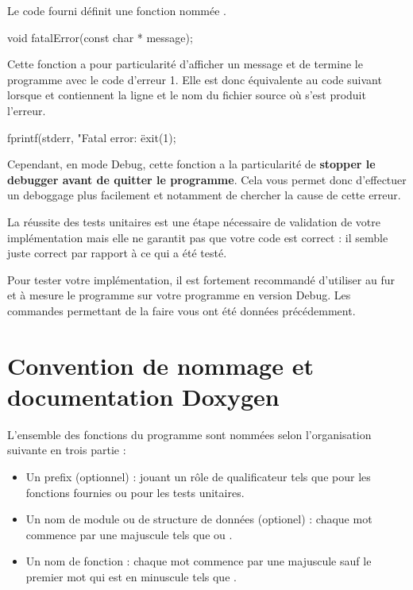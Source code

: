 \begin{tipsandhints}
Le code fourni définit une fonction nommée .
\begin{csource}
void fatalError(const char * message);
\end{csource}
Cette fonction a pour particularité d'afficher un message et de termine le programme avec le code d'erreur 1. Elle est donc équivalente au code suivant lorsque  et  contiennent la ligne et le nom du fichier source où s'est produit l'erreur. 
\begin{csource}
fprintf(stderr, "Fatal error: \"%
exit(1);
\end{csource}
Cependant, en mode Debug, cette fonction  a la particularité de \textbf{stopper le debugger avant de quitter le programme}. Cela vous permet donc d'effectuer un deboggage plus facilement et notamment de chercher la cause de cette erreur.
\end{tipsandhints}

\begin{warning}
La réussite des tests unitaires est une étape nécessaire de validation de votre
implémentation mais elle ne garantit pas que votre code est correct : il semble juste
correct par rapport à ce qui a été testé.
\end{warning}

Pour tester votre implémentation, il est fortement recommandé d'utiliser au fur
et à mesure le programme  sur votre programme en version Debug.
Les commandes permettant de la faire vous ont été données précédemment.

\section{Convention de nommage et documentation Doxygen}

L'ensemble des fonctions du programme sont nommées selon l'organisation suivante
en trois partie :
\begin{itemize}
  \item Un prefix (optionnel) : jouant un rôle de qualificateur tels que
   pour les fonctions fournies  ou  pour
  les tests unitaires.
  \item Un nom de module ou de structure de données (optionel) : chaque mot
  commence par une majuscule tels que  ou .
  \item Un nom de fonction : chaque mot commence par une majuscule sauf le
  premier mot qui est en minuscule tels que .
\end{itemize}

